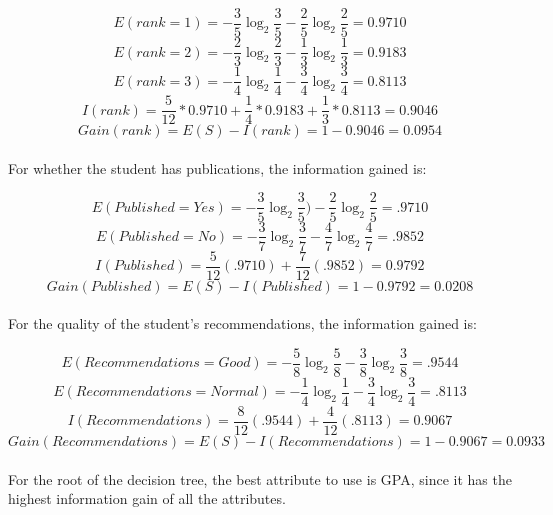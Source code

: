 \documentclass[12pt]{article}
\begin{document}
\begin{equation}
E(rank = 1) = -\frac{3}{5}\log_2\frac{3}{5} -\frac{2}{5}\log_2\frac{2}{5} = 0.9710
\end{equation}
\begin{equation}
E(rank = 2) = -\frac{2}{3}\log_2\frac{2}{3} -\frac{1}{3}\log_2\frac{1}{3} = 0.9183
\end{equation}
\begin{equation}
E(rank = 3) = -\frac{1}{4}\log_2\frac{1}{4} -\frac{3}{4}\log_2\frac{3}{4} = 0.8113
\end{equation}
\begin{equation}
I(rank) = \frac{5}{12} * 0.9710 + \frac{1}{4} * 0.9183 + \frac{1}{3} * 0.8113 = 0.9046
\end{equation}
\begin{equation}
Gain(rank) = E(S) - I(rank) = 1 - 0.9046 = 0.0954
\end{equation}
\\
For whether the student has publications, the information gained is:

\begin{equation}
E(Published = Yes) = -\frac{3}{5}\log_2\frac{3}{5}) - \frac{2}{5}\log_2\frac{2}{5} = .9710
\end{equation}
\begin{equation}
E(Published = No) = -\frac{3}{7}\log_2\frac{3}{7} - \frac{4}{7}\log_2\frac{4}{7} = .9852
\end{equation}
\begin{equation}
I(Published) = \frac{5}{12}(.9710)+\frac{7}{12}(.9852) = 0.9792
\end{equation}
\begin{equation}
Gain(Published) = E(S) - I(Published) = 1 - 0.9792 = 0.0208
\end{equation}
\\
For the quality of the student's recommendations, the information gained is:

\begin{equation}
E(Recommendations = Good) = -\frac{5}{8}\log_2\frac{5}{8}-\frac{3}{8}\log_2\frac{3}{8} = .9544
\end{equation}
\begin{equation}
E(Recommendations = Normal) = -\frac{1}{4}\log_2\frac{1}{4}-\frac{3}{4}\log_2\frac{3}{4} = .8113
\end{equation}
\begin{equation}
I(Recommendations) = \frac{8}{12}(.9544)+\frac{4}{12}(.8113) = 0.9067
\end{equation}
\begin{equation}
Gain(Recommendations) = E(S) - I(Recommendations) = 1 - 0.9067 = 0.0933
\end{equation}
\\
For the root of the decision tree, the best attribute to use is GPA, since it has the highest information gain of all the attributes.
\end{document}
